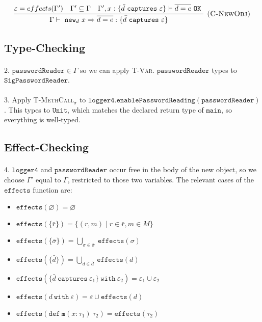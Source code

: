\documentclass{llncs}
\newcommand{\keywadj}[1]{\mathtt{#1}}
\newcommand{\keyw}[1]{\keywadj{#1}~}
\begin{document}
\[
\begin{array}{c}
\infer[\textsc{(C-NewObj)}]
	{\Gamma \vdash~\keywadj{new}_d~x \Rightarrow \overline{d = e} : \{  \bar d~\keyw{captures} \varepsilon \} }
	{\varepsilon = effects(\Gamma') & \Gamma' \subseteq \Gamma & \Gamma', x : \{ \bar d~\keyw {captures} \varepsilon \} \vdash \overline{d = e}~\keyw{OK}} \\
\end{array}
\]

\subsection*{Type-Checking}

\paragraph{}
2. $\keywadj{passwordReader \in \Gamma}$ so we can apply \textsc{T-Var}. $\keywadj{passwordReader}$ types to $\keywadj{SigPasswordReader}$.

\paragraph{}
3. Apply \textsc{T-MethCall$_\sigma$} to $\keywadj{logger4.enablePasswordReading(passwordReader)}$. This types to $\keywadj{Unit}$, which matches the declared return type of $\keywadj{main}$, so everything is well-typed.

\subsection*{Effect-Checking}

\paragraph{}
4. $\keywadj{logger4}$ and $\keywadj{passwordReader}$ occur free in the body of the new object, so we choose $\Gamma'$ equal to $\Gamma$, restricted to those two variables. The relevant cases of the $\keywadj{effects}$ function are:

\begin{itemize}
	\item $\keywadj{effects}(\varnothing) = \varnothing$
	\item $\keywadj{effects}(\{\bar r\}) = \{ (r, m) \mid r \in \bar r, m \in M \}$
	\item $\keywadj{effects}(\{\bar \sigma\}) = \bigcup_{\sigma \in \bar \sigma}~\keywadj{effects}(\sigma)$
	\item $\keywadj{effects}(\{\bar d\}) = \bigcup_{d \in \bar d}~\keywadj{effects}(d)$
	\item $\keywadj{effects}(\{ \bar d~\keyw{captures} \varepsilon_1 \}~\keyw{with} \varepsilon_2) = \varepsilon_1 \cup \varepsilon_2$
	\item $\keywadj{effects}(d~\keyw{with} \varepsilon) = \varepsilon \cup \keywadj{effects}(d)$
	\item $\keywadj{effects}(\keywadj{def~m}(x : \tau_1)~\tau_2) = \keywadj{effects}(\tau_2)$
\end{itemize}
\end{document}
